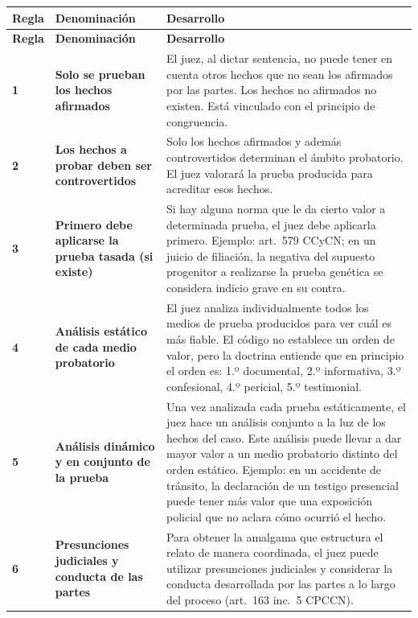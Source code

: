 \documentclass[12pt,oneside]{book}
\begin{document}
\begin{longtable}{>{\raggedright\arraybackslash}p{1.6cm} >{\raggedright\arraybackslash}p{3.8cm} >{\raggedright\arraybackslash}p{7.6cm}}
\toprule
\textbf{Regla} & \textbf{Denominación} & \textbf{Desarrollo} \\
\midrule
\endfirsthead
\toprule
\textbf{Regla} & \textbf{Denominación} & \textbf{Desarrollo} \\
\midrule
\endhead

\textbf{1} & \textbf{Solo se prueban los hechos afirmados} & El juez, al dictar sentencia, no puede tener en cuenta otros hechos que no sean los afirmados por las partes. Los hechos no afirmados no existen. Está vinculado con el principio de congruencia. \\
\addlinespace
\textbf{2} & \textbf{Los hechos a probar deben ser controvertidos} & Solo los hechos afirmados y además controvertidos determinan el ámbito probatorio. El juez valorará la prueba producida para acreditar esos hechos. \\
\addlinespace
\textbf{3} & \textbf{Primero debe aplicarse la prueba tasada (si existe)} & Si hay alguna norma que le da cierto valor a determinada prueba, el juez debe aplicarla primero. Ejemplo: art.~579 CCyCN; en un juicio de filiación, la negativa del supuesto progenitor a realizarse la prueba genética se considera indicio grave en su contra. \\
\addlinespace
\textbf{4} & \textbf{Análisis estático de cada medio probatorio} & El juez analiza individualmente todos los medios de prueba producidos para ver cuál es más fiable. El código no establece un orden de valor, pero la doctrina entiende que en principio el orden es: 1.º documental, 2.º informativa, 3.º confesional, 4.º pericial, 5.º testimonial. \\
\addlinespace
\textbf{5} & \textbf{Análisis dinámico y en conjunto de la prueba} & Una vez analizada cada prueba estáticamente, el juez hace un análisis conjunto a la luz de los hechos del caso. Este análisis puede llevar a dar mayor valor a un medio probatorio distinto del orden estático. Ejemplo: en un accidente de tránsito, la declaración de un testigo presencial puede tener más valor que una exposición policial que no aclara cómo ocurrió el hecho. \\
\addlinespace
\textbf{6} & \textbf{Presunciones judiciales y conducta de las partes} & Para obtener la amalgama que estructura el relato de manera coordinada, el juez puede utilizar presunciones judiciales y considerar la conducta desarrollada por las partes a lo largo del proceso (art.~163 inc.~5 CPCCN). \\

\end{longtable}
\end{document}
